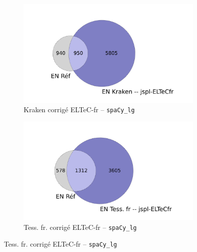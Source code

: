 \begin{figure}[h!]
\begin{minipage}{7cm}
\begin{subfigure}{1\textwidth}
 \label{fig:ELTeCFRA_Tess. fr -- jspl-fr_spacy-lg-concat_intersection.png}
  \end{subfigure}
    \end{minipage}
\begin{minipage}{7cm}
  \begin{subfigure}{1\textwidth}
  \includegraphics[width=1\textwidth]{IMAGES/INTERSECTIONS_GLOBALES/ELTeCFRA_Kraken -- jspl-ELTeCfr_spacy-lg-concat_intersection.png} 
  \caption{Kraken corrigé ELTeC-fr -- \texttt{spaCy\_lg}}
  \label{fig:ELTeCFRA_Kraken -- jspl-ELTeCfr_spacy-lg-concat_intersection}
  \end{subfigure}
  \end{minipage}
  \begin{minipage}{7cm}
  \begin{subfigure}{1\textwidth}
  \includegraphics[width=1\textwidth]{IMAGES/INTERSECTIONS_GLOBALES/ELTeCFRA_Tess. fr -- jspl-ELTeCfr_spacy-lg-concat_intersection.png} %
  \caption{Tess. fr. corrigé ELTeC-fr -- \texttt{spaCy\_lg}}
  \label{fig:ELTeCFRA_Tess -- jspl-ELTeCFR_spacy-lg-concat_intersection}

\end{subfigure}
\end{minipage}
\end{figure}

